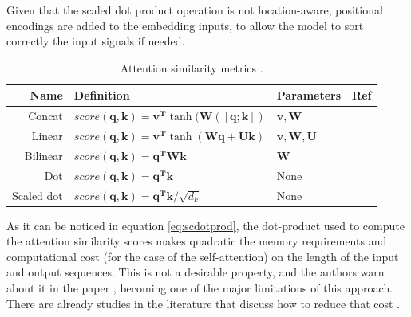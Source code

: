 Given that the scaled dot product operation is not location-aware, positional encodings are added to the embedding inputs, to allow the model to sort correctly the input signals if needed.

\begin{table}
\caption[Attention similarity metrics]{Attention similarity metrics \autocite{uday2019}.}
\footnotesize
\centering
\begin{tabular}{r|lll}
	\toprule
	                        Name & Definition                                                                                        & Parameters                           & Ref                     \\ \midrule
	           Concat & $score(\mathbf{q}, \mathbf{k}) = \mathbf{v^T} \tanh(\mathbf{W}([\mathbf{q};\mathbf{k}])$          & $\mathbf{v}, \mathbf{W}$             & \autocite{Luong2015}    \\
	           Linear  & $score(\mathbf{q}, \mathbf{k}) = \mathbf{v^T} \tanh(\mathbf{W}\mathbf{q} + \mathbf{U}\mathbf{k})$ & $\mathbf{v}, \mathbf{W}, \mathbf{U}$ & \autocite{bahdanau2015} \\
	   Bilinear & $score(\mathbf{q}, \mathbf{k}) =  \mathbf{q^T} \mathbf{W} \mathbf{k}$                             & $\mathbf{W}$                         & \autocite{Luong2015}    \\
	       Dot & $score(\mathbf{q}, \mathbf{k}) = \mathbf{q^T}  \mathbf{k}$                                        & None                                 & \autocite{vaswani2017}  \\
	Scaled dot   & $score(\mathbf{q}, \mathbf{k}) =  \mathbf{q^T} \mathbf{k} / \sqrt{d_k}$                           & None                                 & \autocite{Luong2015}    \\ \bottomrule
\end{tabular}
\label{table:attentionsimilarities}
\end{table}

As it can be noticed in equation \ref{eq:scdotprod}, the dot-product used to compute the attention similarity scores makes quadratic the memory requirements and computational cost  (for the case of the self-attention) on the length of the input and output sequences. This is not a desirable property, and the authors warn about it in the paper \autocite{vaswani2017}, becoming one of the major limitations of this approach. There are already studies in the literature that discuss how to reduce that cost \autocite{jaegle2021, so2021}.

